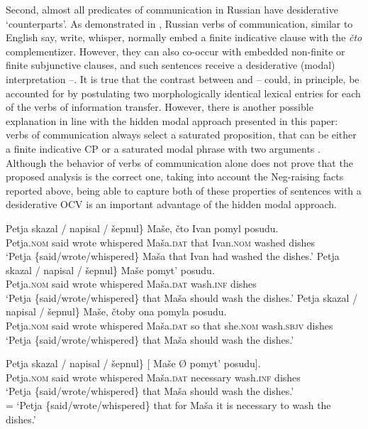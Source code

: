 \documentclass[output=paper,
colorlinks,
citecolor=brown,
newtxmath
]{langscibook}
\begin{document}
Second, almost all predicates of communication in Russian have desiderative `counterparts’. As demonstrated in , Russian verbs of communication, similar to English say, write, whisper, normally embed a finite indicative clause with the \textit{čto} complementizer. However, they can also co-occur with embedded non-finite or finite subjunctive clauses, and such sentences receive a desiderative (modal) interpretation --. It is true that the contrast between  and -- could, in principle, be accounted for by postulating two morphologically identical lexical entries for each of the verbs of information transfer. However, there is another possible explanation in line with the hidden modal approach presented in this paper: verbs of communication always select a saturated proposition, that can be either a finite indicative CP or a saturated modal phrase with two arguments . Although the behavior of verbs of communication alone does not prove that the proposed analysis is the correct one, taking into account the Neg-raising facts reported above, being able to capture both of these properties of sentences with a desiderative OCV is an important advantage of the hidden modal approach. 


\ea\label{ex17} 
\ea\label{ex17a} 
\gll Petja \minsp{\{} skazal / napisal / šepnul\} Maše, čto Ivan pomyl posudu.\\ 
    Petja.\textsc{nom} {} said {} wrote {} whispered Maša.\textsc{dat} that Ivan.\textsc{nom} washed dishes\\
\glt `Petja \{said/wrote/whispered\} Maša that Ivan had washed the dishes.'
\ex\label{ex17b}
\gll Petja \minsp{\{} skazal / napisal / šepnul\} Maše pomyt’ posudu.\\ 
    Petja.\textsc{nom} {} said {} wrote {} whispered Maša.\textsc{dat} wash.\textsc{inf} dishes\\
\glt `Petja \{said/wrote/whispered\} that Maša should wash the dishes.'
\ex\label{ex17c}
\gll Petja \minsp{\{} skazal / napisal / šepnul\} Maše, čtoby ona pomyla posudu.\\ 
    Petja.\textsc{nom} {} said {} wrote {} whispered Maša.\textsc{dat} {so that} she.\textsc{nom} wash.\textsc{sbjv} dishes\\
\glt `Petja \{said/wrote/whispered\} that Maša should wash the dishes.'
\z
\z

\ea\label{ex18}
\gll Petja	\minsp{\{} skazal / napisal / šepnul\} [\hspace{-2pt} Maše Ø pomyt’ posudu].\\ 
    Petja.\textsc{nom} {} said {} wrote {} whispered {} Maša.\textsc{dat} necessary wash.\textsc{inf} dishes\\
\glt `Petja \{said/wrote/whispered\} that Maša should wash the dishes.' \\ 
= `Petja \{said/wrote/whispered\} that for Maša it is necessary to wash the dishes.'
\z
\end{document}

